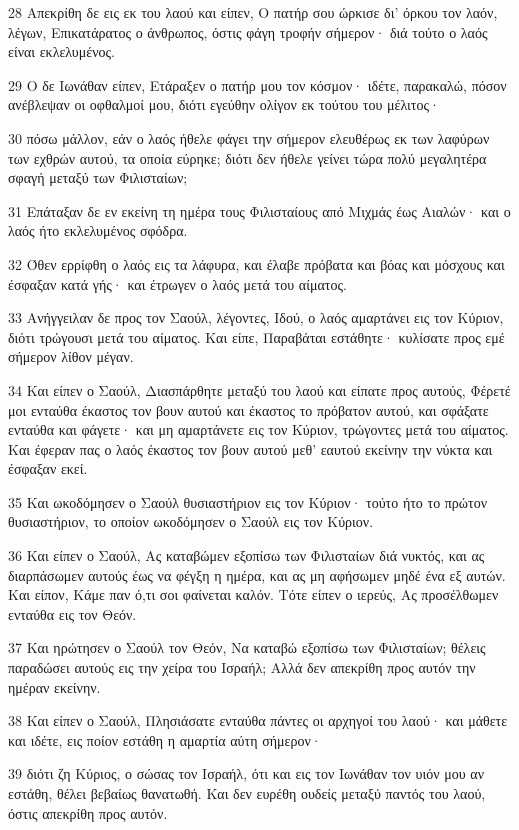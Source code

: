 \par 28 Απεκρίθη δε εις εκ του λαού και είπεν, Ο πατήρ σου ώρκισε δι' όρκου τον λαόν, λέγων, Επικατάρατος ο άνθρωπος, όστις φάγη τροφήν σήμερον· διά τούτο ο λαός είναι εκλελυμένος.
\par 29 Ο δε Ιωνάθαν είπεν, Ετάραξεν ο πατήρ μου τον κόσμον· ιδέτε, παρακαλώ, πόσον ανέβλεψαν οι οφθαλμοί μου, διότι εγεύθην ολίγον εκ τούτου του μέλιτος·
\par 30 πόσω μάλλον, εάν ο λαός ήθελε φάγει την σήμερον ελευθέρως εκ των λαφύρων των εχθρών αυτού, τα οποία εύρηκε; διότι δεν ήθελε γείνει τώρα πολύ μεγαλητέρα σφαγή μεταξύ των Φιλισταίων;
\par 31 Επάταξαν δε εν εκείνη τη ημέρα τους Φιλισταίους από Μιχμάς έως Αιαλών· και ο λαός ήτο εκλελυμένος σφόδρα.
\par 32 Όθεν ερρίφθη ο λαός εις τα λάφυρα, και έλαβε πρόβατα και βόας και μόσχους και έσφαξαν κατά γής· και έτρωγεν ο λαός μετά του αίματος.
\par 33 Ανήγγειλαν δε προς τον Σαούλ, λέγοντες, Ιδού, ο λαός αμαρτάνει εις τον Κύριον, διότι τρώγουσι μετά του αίματος. Και είπε, Παραβάται εστάθητε· κυλίσατε προς εμέ σήμερον λίθον μέγαν.
\par 34 Και είπεν ο Σαούλ, Διασπάρθητε μεταξύ του λαού και είπατε προς αυτούς, Φέρετέ μοι ενταύθα έκαστος τον βουν αυτού και έκαστος το πρόβατον αυτού, και σφάξατε ενταύθα και φάγετε· και μη αμαρτάνετε εις τον Κύριον, τρώγοντες μετά του αίματος. Και έφεραν πας ο λαός έκαστος τον βουν αυτού μεθ' εαυτού εκείνην την νύκτα και έσφαξαν εκεί.
\par 35 Και ωκοδόμησεν ο Σαούλ θυσιαστήριον εις τον Κύριον· τούτο ήτο το πρώτον θυσιαστήριον, το οποίον ωκοδόμησεν ο Σαούλ εις τον Κύριον.
\par 36 Και είπεν ο Σαούλ, Ας καταβώμεν εξοπίσω των Φιλισταίων διά νυκτός, και ας διαρπάσωμεν αυτούς έως να φέγξη η ημέρα, και ας μη αφήσωμεν μηδέ ένα εξ αυτών. Και είπον, Κάμε παν ό,τι σοι φαίνεται καλόν. Τότε είπεν ο ιερεύς, Ας προσέλθωμεν ενταύθα εις τον Θεόν.
\par 37 Και ηρώτησεν ο Σαούλ τον Θεόν, Να καταβώ εξοπίσω των Φιλισταίων; θέλεις παραδώσει αυτούς εις την χείρα του Ισραήλ; Αλλά δεν απεκρίθη προς αυτόν την ημέραν εκείνην.
\par 38 Και είπεν ο Σαούλ, Πλησιάσατε ενταύθα πάντες οι αρχηγοί του λαού· και μάθετε και ιδέτε, εις ποίον εστάθη η αμαρτία αύτη σήμερον·
\par 39 διότι ζη Κύριος, ο σώσας τον Ισραήλ, ότι και εις τον Ιωνάθαν τον υιόν μου αν εστάθη, θέλει βεβαίως θανατωθή. Και δεν ευρέθη ουδείς μεταξύ παντός του λαού, όστις απεκρίθη προς αυτόν.
